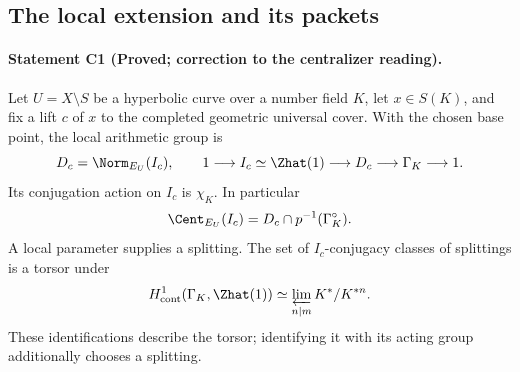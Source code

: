 \subsection{The local extension and its packets}

\paragraph{Statement C1 (Proved; correction to the centralizer reading).}\label{res:C1}
Let $U=X\setminus S$ be a hyperbolic curve over a number field $K$, let $x\in S(K)$, and fix a lift $c$ of $x$ to the completed geometric universal cover. With the chosen base point, the local arithmetic group is
\[
 D_c=\Norm_{E_U}(I_c),\qquad
 1\longrightarrow I_c\simeq\Zhat(1)\longrightarrow D_c
   \longrightarrow\Gamma_K\longrightarrow1.
\]
Its conjugation action on $I_c$ is $\chi_K$. In particular
\[
 \Cent_{E_U}(I_c)=D_c\cap p^{-1}(\Gamma_K^\circ).
\]
A local parameter supplies a splitting. The set of $I_c$-conjugacy classes of splittings is a torsor under
\[
 H^1_{\mathrm{cont}}(\Gamma_K,\Zhat(1))
   \simeq\varprojlim_{n\mid m} K^*/K^{*n}.
\]
These identifications describe the torsor; identifying it with its acting group additionally chooses a splitting.
